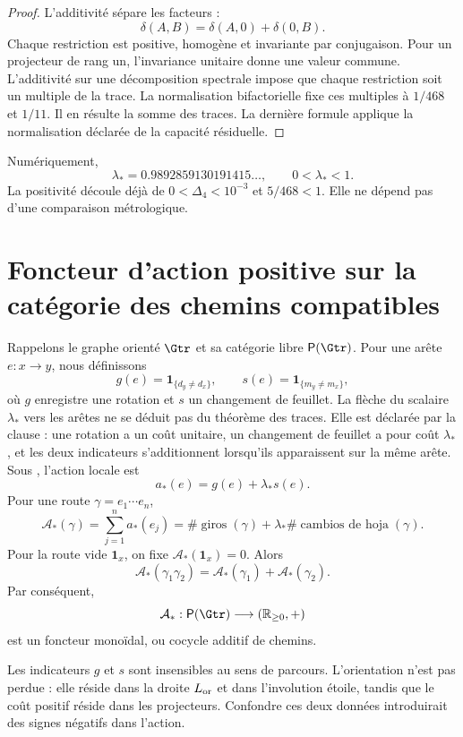 \begin{proof}
L’additivité sépare les facteurs :
\[
 \delta(A,B)=\delta(A,0)+\delta(0,B).
\]
Chaque restriction est positive, homogène et invariante par conjugaison. Pour
un projecteur de rang un, l’invariance unitaire donne une valeur commune.
L’additivité sur une décomposition spectrale impose que chaque restriction
soit un multiple de la trace. La normalisation bifactorielle fixe ces multiples à
\(1/468\) et \(1/11\). Il en résulte la somme des traces. La dernière formule
applique la normalisation déclarée de la capacité résiduelle.
\end{proof}

Numériquement,
\[
 \boxed{\lambda_*=0.9892859130191415\ldots},
 \qquad
 0<\lambda_*<1.
\]
La positivité découle déjà de
\(0<\Delta_4<10^{-3}\) et \(5/468<1\). Elle ne dépend pas d’une comparaison
métrologique.

\section{Foncteur d’action positive sur la catégorie des chemins compatibles}

Rappelons le graphe orienté \(\Gtr\) et sa catégorie libre
\(\mathsf P(\Gtr)\). Pour une arête
\(e:x\to y\), nous définissons
\[
 g(e)=\mathbf1_{\{d_y\ne d_x\}},
 \qquad
 s(e)=\mathbf1_{\{m_y\ne m_x\}},
\]
où \(g\) enregistre une rotation et \(s\) un changement de feuillet. La flèche du
scalaire \(\lambda_*\) vers les arêtes ne se déduit pas du
théorème des traces. Elle est déclarée par la clause \HLoc : une rotation a un coût
unitaire, un changement de feuillet a pour coût \(\lambda_*\), et les deux indicateurs
s’additionnent lorsqu’ils apparaissent sur la même arête. Sous \HLoc, l’action locale est
\[
 \boxed{a_*(e)=g(e)+\lambda_*s(e).}
\]
Pour une route \(\gamma=e_1\cdots e_n\),
\[
 \mathcal A_*(\gamma)
 =\sum_{j=1}^na_*(e_j)
 =\#\operatorname{giros}(\gamma)
 +\lambda_*\#\operatorname{cambios\ de\ hoja}(\gamma).
\]
Pour la route vide \(\mathbf1_x\), on fixe
\(\mathcal A_*(\mathbf1_x)=0\). Alors
\[
 \boxed{
 \mathcal A_*(\gamma_1\gamma_2)
 =\mathcal A_*(\gamma_1)+\mathcal A_*(\gamma_2).
 }
\]
Par conséquent,
\[
 \mathcal A_*:\mathsf P(\Gtr)\longrightarrow(\mathbb R_{\ge0},+)
\]
est un foncteur monoïdal, ou cocycle additif de chemins.

Les indicateurs \(g\) et \(s\) sont insensibles au sens de parcours.
L’orientation n’est pas perdue : elle réside dans la droite \(L_{\rm or}\) et dans
l’involution étoile, tandis que le coût positif réside dans les
projecteurs. Confondre ces deux données introduirait des signes négatifs dans
l’action.

